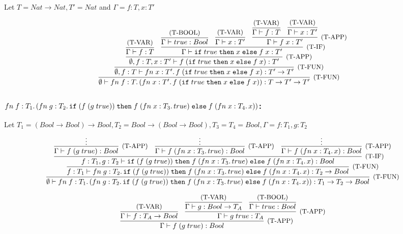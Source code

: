 Let $T = Nat \to Nat, T' = Nat$ and $\Gamma = f: T, x: T'$

\[
	\infer[\text{\small{(T-FUN)}}]
	{\emptyset \vdash \FN{f: T}{(\FN{x: T'}{\APP{f}{(\IF{true}{x}{\APP{f}{x}})}})}: T \to T' \to T'}
	{
		\infer[\text{\small{(T-FUN)}}]
		{ \emptyset, f: T \vdash \FN{x: T'}{\APP{f}{(\IF{true}{x}{\APP{f}{x}})}}: T' \to T' }
		{
			\infer[\text{\small{(T-APP)}}]
			{ \emptyset, f: T, x: T' \vdash \APP{f}{(\IF{true}{x}{\APP{f}{x}})}: T' }
			{
				\infer{\Gamma \vdash f: T}{\text{\small{(T-VAR)}}} &
				\infer[\text{\small{(T-IF)}}]{\Gamma \vdash \IF{true}{x}{\APP{f}{x}}: T'}
				{
					\infer{\Gamma \vdash true: Bool}{\text{\small{(T-BOOL)}}} &
					\infer{\Gamma \vdash x: T'}{\text{\small{(T-VAR)}}} &
					\infer[\text{\small{(T-APP)}}]
					{ \Gamma \vdash \APP{f}{x}: T' }
					{
						\infer{\Gamma \vdash f: T}{\text{\small{(T-VAR)}}} &
						\infer{\Gamma \vdash x: T'}{\text{\small{(T-VAR)}}}
					}
				}
			}
		}
	}
\]

\subsubsection*{$fn\;f: T_1.\,(fn\;g: T_2.\,\texttt{if}\;(f\;(g\;true))\;\texttt{then}\;f\;(fn\;x:T_3.\,true)\;\texttt{else}\;f\;(fn\;x: T_4.\,x))$:}

Let $T_1 = (Bool \to Bool) \to Bool, T_2 = Bool \to (Bool \to Bool), T_3 = T_4 = Bool, \Gamma = f: T_1, g: T_2$
\[
	\infer[\text{\small{(T-FUN)}}]
	{
		\emptyset \vdash \FN{f: T_1}{(\FN{g: T_2}{\IF{(\APP{f}{(\APP{g}{true})})}{\APP{f}{(\FN{x:T_3}{true})}}{\APP{f}{(\FN{x: T_4}{x})}}})}: T_1 \to T_2 \to Bool
	}
	{
		\infer[\text{\small{(T-FUN)}}]
		{
			f: T_1 \vdash \FN{g: T_2}{\IF{(\APP{f}{(\APP{g}{true})})}{\APP{f}{(\FN{x:T_3}{true})}}{\APP{f}{(\FN{x: T_4}{x})}}}: T_2 \to Bool
		}
		{
			\infer[\text{\small{(T-IF)}}]
			{
				f: T_1, g: T_2 \vdash \IF{(\APP{f}{(\APP{g}{true})})}{\APP{f}{(\FN{x:T_3}{true})}}{\APP{f}{(\FN{x: T_4}{x})}}: Bool
			}
			{
				\infer[\text{\small{(T-APP)}}]
				{\Gamma \vdash \APP{f}{(\APP{g}{true})}: Bool}
				{
					\vdots
				} &
				\infer[\text{\small{(T-APP)}}]
				{
					\Gamma \vdash \APP{f}{(\FN{x: T_3}{true})}: Bool
				}
				{
					\vdots
				} &
				\infer[\text{\small{(T-APP)}}]
				{
					\Gamma \vdash \APP{f}{(\FN{x: T_4}{x})}: Bool
				}
				{
					\vdots
				}
			}
		}
	}
\]

\[
	\infer[\text{\small{(T-APP)}}]
	{\Gamma \vdash \APP{f}{(\APP{g}{true})}: Bool}
	{
		\infer{\Gamma \vdash f: T_A \to Bool}{\text{\small{(T-VAR)}}} &
		\infer[\text{\small{(T-APP)}}]
		{\Gamma \vdash \APP{g}{true}: T_A}
		{
			\infer{\Gamma \vdash g: Bool \to T_A}{\text{\small{(T-VAR)}}} &
			\infer{\Gamma \vdash true: Bool}{\text{\small{(T-BOOL)}}}
		}
	}
\]

